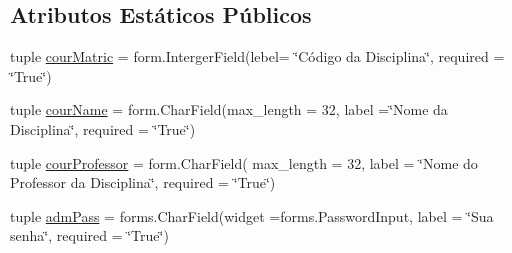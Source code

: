 \subsection*{Atributos Estáticos Públicos}
\begin{DoxyCompactItemize}
\item 
tuple \hyperlink{classAdm_1_1forms_1_1AdmRegCourForm_a5030e7e3ac46b325e10adc6d39ea9736}{cour\-Matric} = form.\-Interger\-Field(lebel= \char`\"{}Código da Disciplina\char`\"{}, required = \char`\"{}True\char`\"{})
\item 
tuple \hyperlink{classAdm_1_1forms_1_1AdmRegCourForm_afc325feb749069ea57387630cc0acc5a}{cour\-Name} = form.\-Char\-Field(max\-\_\-length = 32, label =\char`\"{}Nome da Disciplina\char`\"{}, required = \char`\"{}True\char`\"{})
\item 
tuple \hyperlink{classAdm_1_1forms_1_1AdmRegCourForm_a6fcfad36a149364899dc7c95f239691f}{cour\-Professor} = form.\-Char\-Field( max\-\_\-length = 32, label = \char`\"{}Nome do Professor da Disciplina\char`\"{}, required = \char`\"{}True\char`\"{})
\item 
tuple \hyperlink{classAdm_1_1forms_1_1AdmRegCourForm_a0b753c4784edb7d3f2bbca64f8883ae9}{adm\-Pass} = forms.\-Char\-Field(widget =forms.\-Password\-Input, label = \char`\"{}Sua senha\char`\"{}, required = \char`\"{}True\char`\"{})
\end{DoxyCompactItemize}


